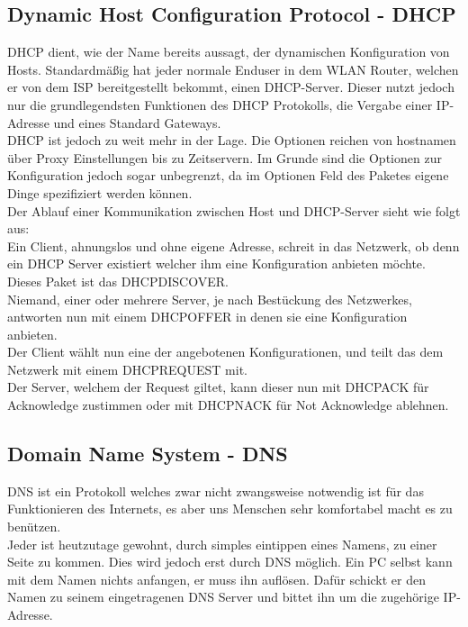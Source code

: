 \documentclass[11pt,a4paper]{report}
\begin{document}
\subsection{Dynamic Host Configuration Protocol - DHCP}
DHCP dient, wie der Name bereits aussagt, der dynamischen Konfiguration von Hosts. Standardmäßig hat jeder normale Enduser in dem WLAN Router, welchen er von dem ISP bereitgestellt bekommt, einen DHCP-Server. Dieser nutzt jedoch nur die grundlegendsten Funktionen des DHCP Protokolls, die Vergabe einer IP-Adresse und eines Standard Gateways.\\
DHCP ist jedoch zu weit mehr in der Lage. Die Optionen reichen von hostnamen über Proxy Einstellungen bis zu Zeitservern. Im Grunde sind die Optionen zur Konfiguration jedoch sogar unbegrenzt, da im Optionen Feld des Paketes eigene Dinge spezifiziert werden können.\\

Der Ablauf einer Kommunikation zwischen Host und DHCP-Server sieht wie folgt aus:\\
Ein Client, ahnungslos und ohne eigene Adresse, schreit in das Netzwerk, ob denn ein DHCP Server existiert welcher ihm eine Konfiguration anbieten möchte. Dieses Paket ist das DHCPDISCOVER.\\
Niemand, einer oder mehrere Server, je nach Bestückung des Netzwerkes, antworten nun mit einem DHCPOFFER in denen sie eine Konfiguration anbieten.\\
Der Client wählt nun eine der angebotenen Konfigurationen, und teilt das dem Netzwerk mit einem DHCPREQUEST mit.\\
Der Server, welchem der Request giltet, kann dieser nun mit DHCPACK für Acknowledge zustimmen oder mit DHCPNACK für Not Acknowledge ablehnen.\\

\subsection{Domain Name System - DNS}
DNS ist ein Protokoll welches zwar nicht zwangsweise notwendig ist für das Funktionieren des Internets, es aber uns Menschen sehr komfortabel macht es zu benützen.\\
Jeder ist heutzutage gewohnt, durch simples eintippen eines Namens, zu einer Seite zu kommen. Dies wird jedoch erst durch DNS möglich. Ein PC selbst kann mit dem Namen nichts anfangen, er muss ihn auflösen. Dafür schickt er den Namen zu seinem eingetragenen DNS Server und bittet ihn um die zugehörige IP-Adresse.\\
\end{document}
